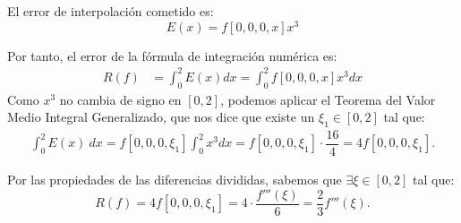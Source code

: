 \begin{ejercicio}
\begin{enumerate}
        El error de interpolación cometido es:
        \begin{equation*}
            E(x) = f[0,0,0,x]x^3
        \end{equation*}

        Por tanto, el error de la fórmula de integración numérica es:
        \begin{align*}
            R(f) &= \int_{0}^{2} E(x) dx = \int_{0}^{2} f[0,0,0,x]x^3 dx
        \end{align*}
        Como $x^3$ no cambia de signo en $[0,2]$, podemos aplicar el Teorema del Valor Medio Integral Generalizado, que nos dice que existe un $\xi_1 \in [0, 2]$ tal que:
        \begin{align*}
            \int_{0}^{2} E(x)\ dx = f[0,0,0,\xi_1]\int_{0}^{2} x^3 dx = f[0,0,0,\xi_1]\cdot \dfrac{16}{4} = 4f[0,0,0,\xi_1].
        \end{align*}

        Por las propiedades de las diferencias divididas, sabemos que $\exists \xi\in [0, 2]$ tal que:
        \begin{equation*}
            R(f) = 4f[0,0,0,\xi_1] = 4\cdot \dfrac{f'''(\xi)}{6} = \dfrac{2}{3}f'''(\xi).
        \end{equation*}

    \end{enumerate}
\end{ejercicio}

